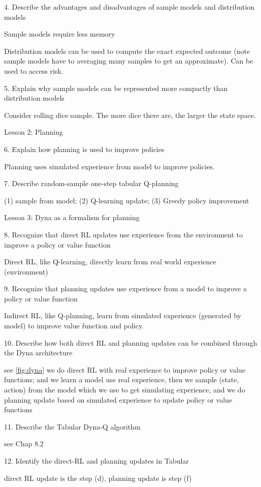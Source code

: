 \documentclass[sutton_barto_notes.tex]{subfiles}
\begin{document}
4. Describe the advantages and disadvantages of sample models and distribution models 

Sample models require less memory

Distribution models can be used to compute the exact expected outcome (note sample models have to averaging many samples to get an approximate). Can be used to access risk.

5. Explain why sample models can be represented more compactly than distribution models

Consider rolling dice sample. The more dice there are, the larger the state space.

Lesson 2: Planning 

6. Explain how planning is used to improve policies 

Planning uses simulated experience from model to improve policies.

7. Describe random-sample one-step tabular Q-planning 

(1) sample from model; (2) Q-learning update; (3) Greedy policy improvement

Lesson 3: Dyna as a formalism for planning 

8. Recognize that direct RL updates use experience from the environment to improve a policy or value function 

Direct RL, like Q-learning, directly learn from real world experience (environment)

9. Recognize that planning updates use experience from a model to improve a policy or value function 

Indirect RL, like Q-planning, learn from simulated experience (generated by model) to improve value function and policy.

10. Describe how both direct RL and planning updates can be combined through the Dyna architecture

see \ref{fig:dyna} we do direct RL with real experience to improve policy or value functions; and we learn a model use real experience, then we sample (state, action) from the model which we use to get simulating experience, and we do planning update based on simulated experience to update policy or value functions

11. Describe the Tabular Dyna-Q algorithm 

see Chap 8.2

12. Identify the direct-RL and planning updates in Tabular 

direct RL update is the step (d), planning update is step (f)
\end{document}
